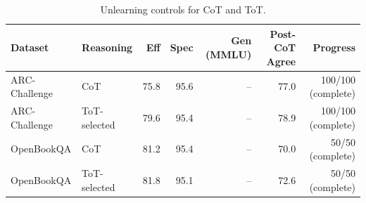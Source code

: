 \begin{table}[H]
\centering
\caption{Unlearning controls for CoT and ToT.}
\label{tab:cot-tot-controls}
\begin{tabular}{llrrrrr}
\toprule
Dataset & Reasoning & Eff & Spec & Gen (MMLU) & Post-CoT Agree & Progress \\
\midrule
ARC-Challenge & CoT & 75.8 & 95.6 & -- & 77.0 & 100/100 (complete) \\
ARC-Challenge & ToT-selected & 79.6 & 95.4 & -- & 78.9 & 100/100 (complete) \\
OpenBookQA & CoT & 81.2 & 95.4 & -- & 70.0 & 50/50 (complete) \\
OpenBookQA & ToT-selected & 81.8 & 95.1 & -- & 72.6 & 50/50 (complete) \\
\bottomrule
\end{tabular}
\end{table}
